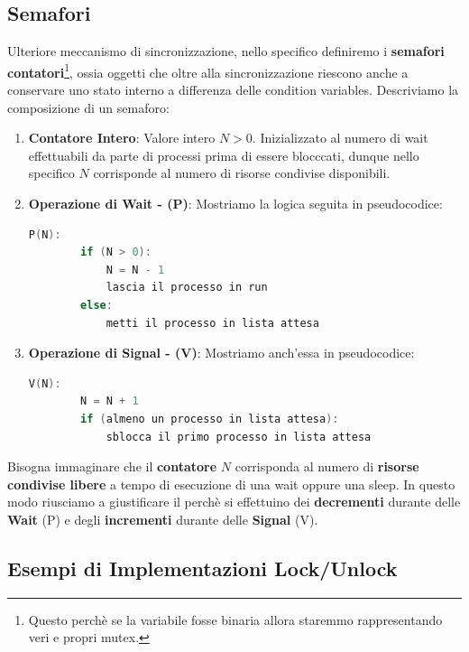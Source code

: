 \documentclass{article}
\begin{document}
\subsection{Semafori}

Ulteriore meccanismo di sincronizzazione, nello specifico definiremo i \textbf{semafori contatori}\footnote{Questo perchè se la variabile fosse binaria allora staremmo rappresentando veri e propri mutex.}, ossia oggetti che oltre alla sincronizzazione
riescono anche a conservare uno stato interno a differenza delle condition variables. Descriviamo la composizione di un semaforo:

\begin{enumerate}
    \item \textbf{Contatore Intero}: Valore intero $N > 0$. Inizializzato al numero di wait effettuabili da parte di processi prima di essere blocccati, dunque nello specifico $N$ corrisponde al numero di risorse condivise disponibili.
    \item \textbf{Operazione di Wait - (P)}: Mostriamo la logica seguita in pseudocodice:
    
    \begin{lstlisting}[language = C]
    P(N):
        if (N > 0):
            N = N - 1
            lascia il processo in run
        else:
            metti il processo in lista attesa
    \end{lstlisting}   
    \vspace*{-8px}
    \item \textbf{Operazione di Signal - (V)}: Mostriamo anch'essa in pseudocodice:
    \begin{lstlisting}[language = C]
    V(N):
        N = N + 1
        if (almeno un processo in lista attesa):
            sblocca il primo processo in lista attesa
    \end{lstlisting}
\end{enumerate}
\vspace*{-20px}
Bisogna immaginare che il \textbf{contatore} $N$ corrisponda al numero di \textbf{risorse condivise libere} a tempo di esecuzione di una wait oppure una sleep. In questo
modo riusciamo a giustificare il perchè si effettuino dei \textbf{decrementi} durante delle \textbf{Wait} (P) e degli \textbf{incrementi} durante delle \textbf{Signal} (V).

\newpage

\subsection{Esempi di Implementazioni Lock/Unlock}
\end{document}

